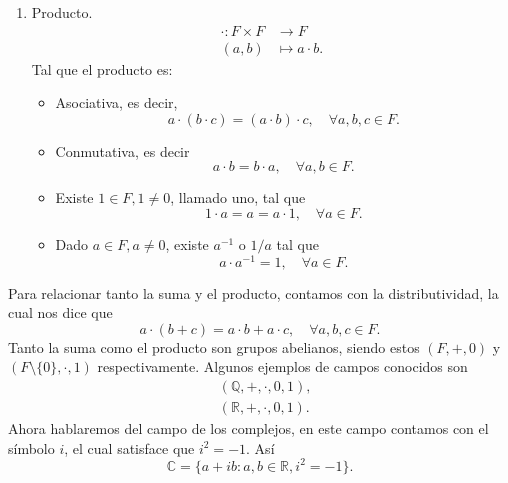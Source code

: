 \documentclass[12pt,a4paper]{book}
\begin{document}
\begin{enumerate}
        \item Producto.
        \begin{align*}
            \cdot: F \times F &\to F \\
            (a,b) &\mapsto a \cdot b.
        \end{align*}
        Tal que el producto es:
        \begin{itemize}
            \item Asociativa, es decir, 
            \begin{equation*}
                a \cdot (b \cdot c) = (a \cdot b) \cdot c, \quad \forall a,b,c \in F.
            \end{equation*}
            \item Conmutativa, es decir
            \begin{equation*}
                a \cdot b = b \cdot a, \quad \forall a,b \in F.
            \end{equation*}
            \item Existe $1 \in F,1 \ne 0$, llamado uno, tal que
            \begin{equation*}
                1 \cdot a = a = a \cdot 1, \quad \forall a \in F.
            \end{equation*}
            \item Dado $a \in F, a \ne 0$, existe $a^{-1} \text{ o } 1/a$ tal que
            \begin{equation*}
                a \cdot a^{-1} = 1, \quad \forall a \in F.
            \end{equation*}
        \end{itemize}
    \end{enumerate}
    Para relacionar tanto la suma y el producto, contamos con la distributividad, la cual nos dice que 
    \begin{equation*}
        a \cdot (b + c) = a \cdot b + a \cdot c, \quad \forall a,b,c \in F.
    \end{equation*}
    Tanto la suma como el producto son grupos abelianos, siendo estos $(F, + , 0)$ y $(F\setminus \{0\}, \cdot, 1)$ respectivamente. Algunos ejemplos de campos conocidos son
    \begin{align*}
        &(\mathbb{Q}, + , \cdot, 0, 1),\\
        &(\mathbb{R}, + , \cdot, 0, 1).   
    \end{align*}
    Ahora hablaremos del campo de los complejos, en este campo contamos con el símbolo $i$, el cual satisface que $i^{2} = -1.$ Así
    \begin{equation*}
        \mathbb{C} = \{a + ib : a,b \in \mathbb{R}, i^{2} = -1\}.
    \end{equation*}
\end{document}
